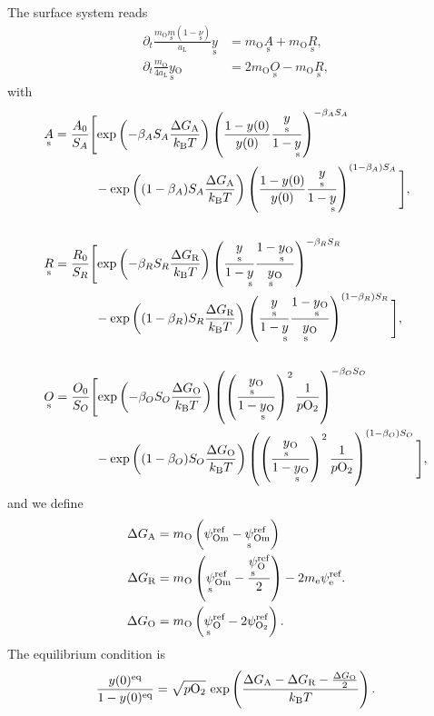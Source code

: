 \documentclass{article}
\numberwithin{equation}{section}
\newcommand{\us}[1]{\underset{\textrm{s}}{#1}{}}
\def\kB{k_\mathrm{B}}
\def\Ox{\mathrm{O}}
\newcommand{\OO}{{\ce{O2}}}
\def\aL{a_\mathrm{L}}
\def\ys{\us y}
\def\y0{y(0)}
\def\yOs{\us y_\textrm{O}}
\def\pO2{p\OO}
\def\A0{A_0}
\def\R0{R_0}
\def\K0{O_0}
\def\DGA{\Delta G_\textrm{A}  }
\def\DGR{\Delta G_\textrm{R}  }
\def\DGO{\Delta G_\textrm{O}  }
\def\betaA{\beta_A}
\def\betaR{\beta_R}
\def\betaO{\beta_O}
\def\SA{S_A}
\def\SR{S_R}
\def\SO{S_O}
\def\eq{\textrm{eq}}
\def\REF{\textrm{ref}}
\begin{document}
The surface system reads
\begin{subequations}
\begin{align}
\partial_t \frac{m_\Ox \us m (1- \us \nu)}{\aL} \ys
&=
m_\Ox \us A
+
m_\Ox \us R,
\\
\partial_t \frac{m_\Ox}{4 \aL} \yOs
&=
2 m_\Ox \us O
-
m_\Ox \us R,
\end{align}
\end{subequations}
with
\begin{subequations}
\begin{align}
&\us A
=
\frac{\A0}{\SA}
\Bigg[
	\textrm{exp}
	\left(
		{-\betaA \SA \frac{\DGA}{\kB T}}
	\right)
	\left(
		\frac{1 - \y0}{\y0}
		\frac{\ys}{1-\ys}
	\right)^{-\betaA \SA}
\\ \nonumber
	&\quad \quad \quad \quad	
	-
	\textrm{exp}
	\left(
		{(1-\betaA) \SA \frac{\DGA}{\kB T}}
	\right)
	\left(
		\frac{1 - \y0}{\y0}
		\frac{\ys}{1-\ys}
	\right)^{(1-\betaA) \SA}
\Bigg],
\\ \nonumber
\\
&\us R
=
\frac{\R0}{\SR}
\Bigg[
	\textrm{exp}
	\left(
		{-\betaR \SR \frac{\DGR}{\kB T}}
	\right)
	\left(
		\frac{\ys}{1- \ys}
		\frac{1-\yOs}{\yOs}
	\right)^{-\betaR \SR}
\\ \nonumber
	& \quad \quad \quad \quad	
	-
	\textrm{exp}
	\left(
		{(1 - \betaR) \SR \frac{\DGR}{\kB T}}
	\right)
	\left(
		\frac{\ys}{1- \ys}
		\frac{1-\yOs}{\yOs}
	\right)^{(1-\betaR) \SR}
\Bigg],
\\ \nonumber
\\
&\us O
=
\frac{\K0}{\SO}
\Bigg[
	\textrm{exp}
	\left(
		{-\betaO \SO \frac{\DGO}{\kB T}}
	\right)
	\left(
		\left(
			\frac{\yOs}{1-\yOs}
		\right)^2
		\frac{1}{\pO2}
	\right)^{-\betaO \SO}
\\ \nonumber
	&\quad \quad \quad \quad	
	-
	\textrm{exp}
	\left(
		{(1-\betaO) \SO \frac{\DGO}{\kB T}}
	\right)
	\left(
		\left(
			\frac{\yOs}{1-\yOs}
		\right)^2
		\frac{1}{\pO2}
	\right)^{(1 - \betaO) \SO}
\Bigg],
\end{align}
\end{subequations}
and we define
\begin{subequations}
\begin{align}
\DGA
&=
m_\Ox
\left(
	\psi_{\textrm{Om}}^\REF
	-
	\us \psi_{\textrm{Om}}^\REF
\right)
\\
\DGR
&= 
m_\Ox
\left(
	\us \psi_{\textrm{Om}}^\REF
	-
	\frac{\us \psi_{\Ox}^\REF}{2}
\right)
-
2 m_\textrm{e} \psi_{\textrm{e}}^\REF.
\\
\DGO
&= 
m_\Ox
\left(
	\us \psi_{\Ox}^\REF
	-
	2 \psi_{\OO}^\REF
\right).
\end{align}
\end{subequations}
The equilibrium condition is
\begin{subequations}
\begin{align}
\frac{\y0^\eq}{1-\y0^\eq} = \sqrt{\pO2} \ \textrm{exp}
\left(
	\frac{\DGA - \DGR - \frac{\DGO}{2}}{\kB T}
\right).
\end{align}
\end{subequations}
\end{document}
